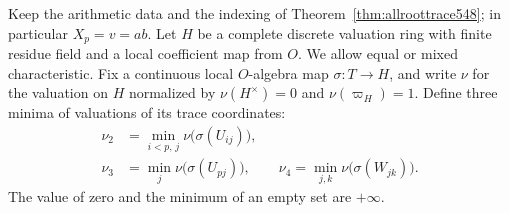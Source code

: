 \documentclass[a4paper,11pt]{article}
\theoremstyle{definition}
\theoremstyle{remark}
\numberwithin{equation}{section}
\begin{document}
Keep the arithmetic data and the indexing of
Theorem~\ref{thm:allroottrace548}; in particular \(X_p=v=ab\).
Let \(H\) be a complete discrete valuation ring with finite residue
field and a local coefficient map from \(O\). We allow equal or
mixed characteristic. Fix a continuous local \(O\)-algebra map
\(\sigma:T\to H\), and write \(\nu\) for the valuation on \(H\)
normalized by \(\nu(H^\times)=0\) and \(\nu(\varpi_H)=1\).
Define three minima of valuations of its trace coordinates:
\[
\begin{split}
 \nu_2&=\min_{i<p,\,j}\nu\bigl(\sigma(U_{ij})\bigr),\\
 \nu_3&=\min_j\nu\bigl(\sigma(U_{pj})\bigr),\qquad
 \nu_4=\min_{j,k}\nu\bigl(\sigma(W_{jk})\bigr).
\end{split}
\]
The value of zero and the minimum of an empty set are \(+\infty\).
\end{document}
